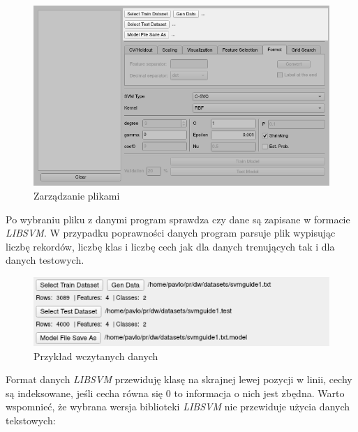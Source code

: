 \documentclass[paper=a4, fontsize=11pt]{scrartcl} %
\numberwithin{equation}{section} %
\numberwithin{figure}{section} %
\begin{document}
    \begin{figure}[H]
        \begin{center}
            \includegraphics[scale=0.7]{./img/svm_app_mainw_filehandler.png}
            \caption{Zarządzanie plikami}
            \label{fig:file_handler}
        \end{center}
    \end{figure}

    \par Po wybraniu pliku z danymi program sprawdza czy dane są zapisane w formacie
    \textit{LIBSVM}. W przypadku poprawności danych program parsuje plik wypisując liczbę
    rekordów, liczbę klas i liczbę cech jak dla danych trenujących tak i dla danych testowych.

    \begin{figure}[H]
        \begin{center}
            \includegraphics[scale=0.8]{./img/svm_app_mainw_filehandler_ex.png}
            \caption{Przykład wczytanych danych}
            \label{fig:files_example1}
        \end{center}
    \end{figure}

    \par Format danych \textit{LIBSVM} przewiduję klasę na skrajnej lewej pozycji w linii, cechy są
    indeksowane, jeśli cecha równa się 0 to informacja o nich jest zbędna. Warto wspomnieć, że
    wybrana wersja biblioteki \textit{LIBSVM} nie przewiduje użycia danych tekstowych:
\end{document}
